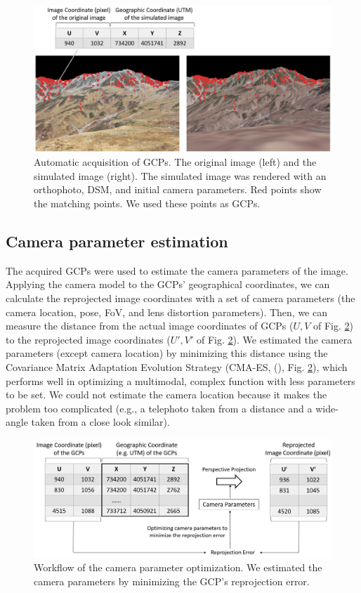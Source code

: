 \documentclass{article}
\begin{document}
\begin{figure}
\includegraphics[width=1\linewidth]{paper_files/figures/Slide4} \caption{Automatic acquisition of GCPs. The original image (left) and the simulated image (right). The simulated image was rendered with an orthophoto, DSM, and initial camera parameters. Red points show the matching points. We used these points as GCPs.}\label{fig:matched}
\end{figure}

\hypertarget{camera-parameter-estimation}{%
\subsection{Camera parameter estimation}\label{camera-parameter-estimation}}

The acquired GCPs were used to estimate the camera parameters of the image. Applying the camera model to the GCPs' geographical coordinates, we can calculate the reprojected image coordinates with a set of camera parameters (the camera location, pose, FoV, and lens distortion parameters). Then, we can measure the distance from the actual image coordinates of GCPs (\(U, V\) of Fig. \ref{fig:optim}) to the reprojected image coordinates (\(U', V'\) of Fig. \ref{fig:optim}). We estimated the camera parameters (except camera location) by minimizing this distance using the Covariance Matrix Adaptation Evolution Strategy (CMA-ES, (\cite{Hansen2003CMAES}), Fig. \ref{fig:optim}), which performs well in optimizing a multimodal, complex function with less parameters to be set. We could not estimate the camera location because it makes the problem too complicated (e.g., a telephoto taken from a distance and a wide-angle taken from a close look similar).



\begin{figure}
\includegraphics[width=1\linewidth]{paper_files/figures/Slide5} \caption{Workflow of the camera parameter optimization. We estimated the camera parameters by minimizing the GCP's reprojection error.}\label{fig:optim}
\end{figure}
\end{document}
